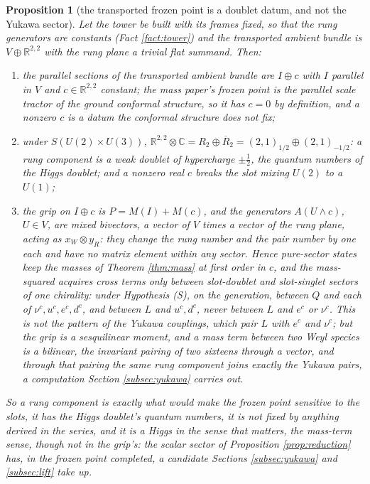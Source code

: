 \documentclass[11pt]{article}
\newtheorem{proposition}[theorem]{Proposition}
\theoremstyle{definition}
\newcommand{\R}{\mathbb{R}}
\newcommand{\C}{\mathbb{C}}
\begin{document}
\begin{proposition}[the transported frozen point is a doublet datum, and not the Yukawa sector]\label{prop:transported}
Let the tower be built with its frames fixed, so that the rung generators are constants (Fact \ref{fact:tower}) and the transported ambient bundle is $V \oplus \R^{2,2}$ with the rung plane a trivial flat summand. Then:
\begin{enumerate}
\item[(i)] the parallel sections of the transported ambient bundle are $I \oplus c$ with $I$ parallel in $V$ and $c \in \R^{2,2}$ constant; the mass paper's frozen point is the parallel scale tractor of the ground conformal structure, so it has $c = 0$ by definition, and a nonzero $c$ is a datum the conformal structure does not fix;
\item[(ii)] under $S(U(2) \times U(3))$, $\R^{2,2} \otimes \C = R_{2} \oplus \overline{R}_{2} = (2,1)_{1/2} \oplus (2,1)_{-1/2}$: a rung component is a weak doublet of hypercharge $\pm\tfrac12$, the quantum numbers of the Higgs doublet; and a nonzero real $c$ breaks the slot mixing $U(2)$ to a $U(1)$;
\item[(iii)] the grip on $I \oplus c$ is $P = M(I) + M(c)$, and the generators $A(U \wedge c)$, $U \in V$, are mixed bivectors, a vector of $V$ times a vector of the rung plane, acting as $x_{W} \otimes y_{R}$: they change the rung number and the pair number by one each and have no matrix element within any sector. Hence pure-sector states keep the masses of Theorem \ref{thm:mass} at first order in $c$, and the mass-squared acquires cross terms only between slot-doublet and slot-singlet sectors of one chirality: under Hypothesis (S), on the generation, between $Q$ and each of $\nu^{c}, u^{c}, e^{c}, d^{c}$, and between $L$ and $u^{c}, d^{c}$, never between $L$ and $e^{c}$ or $\nu^{c}$. This is not the pattern of the Yukawa couplings, which pair $L$ with $e^{c}$ and $\nu^{c}$; but the grip is a sesquilinear moment, and a mass term between two Weyl species is a bilinear, the invariant pairing of two sixteens through a vector, and through that pairing the same rung component joins exactly the Yukawa pairs, a computation Section \ref{subsec:yukawa} carries out.
\end{enumerate}
So a rung component is exactly what would make the frozen point sensitive to the slots, it has the Higgs doublet's quantum numbers, it is not fixed by anything derived in the series, and it is a Higgs in the sense that matters, the mass-term sense, though not in the grip's: the scalar sector of Proposition \ref{prop:reduction} has, in the frozen point completed, a candidate Sections \ref{subsec:yukawa} and \ref{subsec:lift} take up.
\end{proposition}
\end{document}
